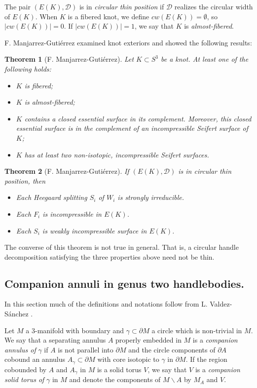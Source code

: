 \documentclass[12pt]{amsart}
\newtheorem{teo}{Theorem}
\begin{document}
The pair $(E(K),\mathcal{D})$ is in \emph{circular thin position} if $\mathcal{D}$ realizes the circular width of $E(K)$. When $K$ is a fibered knot, we define $cw(E(K))=\emptyset$, so $|cw(E(K))|=0$. If $|cw(E(K))|=1$, we say that $K$ is \emph{almost-fibered}.

F. Manjarrez-Guti\'errez \cite{Fabiola} examined knot exteriors and showed the following results:

\begin{teo} [F. Manjarrez-Guti\'errez]
Let $K\subset S^{3}$ be a knot. At least one of the following holds:
\begin{itemize}
\item $K$ is fibered;
\item $K$ is almost-fibered;
\item $K$ contains a closed essential surface in its complement. Moreover, this closed essential surface is in the complement of an incompressible Seifert surface of $K$;
\item $K$ has at least two non-isotopic, incompressible Seifert surfaces.
\end{itemize}
\end{teo}

\begin{teo} [F. Manjarrez-Guti\'errez]\label{Inc}
If $(E(K),\mathcal{D})$ is in circular thin position, then
\begin{itemize}
\item Each Heegaard splitting $S_{i}$ of $W_{i}$ is strongly irreducible.
\item Each $F_{i}$ is incompressible in $E(K)$.
\item Each $S_{i}$ is weakly incompressible surface in $E(K)$.
\end{itemize}
\end{teo}

The converse of this theorem is not true in general. That is, a circular handle decomposition satisfying the three properties above need not be thin.

\subsection{Companion annuli in genus two handlebodies.} 
In this section much of the definitions and notations follow from L. Valdez-S\'anchez \cite{Tejano}.


Let $M$ a $3$-manifold with boundary and $\gamma\subset\partial M$ a circle which is non-trivial in $M$. We say that a separating annulus $A$ properly embedded in $M$ is a \emph{companion annulus of} $\gamma$ if $A$ is not parallel into $\partial M$ and the circle components of $\partial A$ cobound an annulus $A_{\gamma}\subset\partial M$ with core isotopic to $\gamma$ in $\partial M$. If the region cobounded by $A$ and $A_{\gamma}$ in $M$ is a solid torus $V$, we say that $V$ is a \emph{companion solid torus of} $\gamma$ in $M$ and denote the components of $M\backslash A$ by $M_{A}$ and $V$.
\end{document}
